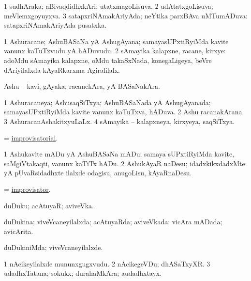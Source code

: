 \bentry
{}
\gl{\gu}
\bmng
\bnum
\num{1} sudhAraka; aBivaqdidhxkAri; utatxmagoLisuva. 
\num{2} udAtatxgoLisuva; meVlemxgoyuyxva. 
\num{3} satapxriNAmakAriyAda; neYtika parxBAva uMTumADuva:  satapxriNAmakAriyAda pusatxka. 
\enum
\emng
\eentry

\bentry
{}
\gl{\nA}
\bmng
\bnum
\num{1} Ashuracane; AshuBASaNa yA AshugAyana; samayasUPxtiRyiMda kavite \mo vanunx kaTuTxvudu yA hADuvudu. 
\num{2} sAmayika kalapxne, racane, kirxye:  adoMdu sAmayika kalapxne, oMdu takaSxNada, konegaLigeya, beVre dAriyilalxda kAyaRkarxma Agiralilalx. 
\enum
\emng
\eentry

\bentry
{}
\gl{\nA}
\bmng
Ashu -- kavi, gAyaka, racanekAra, yA BASaNakAra. 
\emng
\eentry

\bentry
{}
\gl{\gu}
\bmng
\bnum
\num{1} Ashuracaneya; AshusaqSiTxya; AshuBASaNada yA AshugAyanada; samayasUPxtiRyiMda kavite \mo vanunx kaTuTxva, hADuva. 
\num{2} Ashu racanakArana. 
\num{3} AshuracanAshakitxyuLaLx. 
\num{4} sAmayika -- kalapxneya, kirxyeya, saqSiTxya. 
\enum
\emng
\eentry

\bentry
{}
\gl{\gu}
\bmng
 = \hyperlink{improvisatorial}{improvisatorial}. 
\emng
\eentry

\bentry
{}
\gl{\sakirx}
\bmng
\bnum
\num{1} Ashukavite mADu yA AshuBASaNa mADu; samaya sUPxtiRyiMda kavite, saMgiVtakaqti, \mo vanunx kaTiTx hADu. 
\num{2} AshukAyaR naDesu; idadxkikxdadxMte yA pUvaRsidadhxte ilalxde odagisu, anugoLisu, kAyaRnaDesu. 
\enum
\emng
\eentry

\bentry
{}
\gl{\nA}
\bmng
 = \hyperlink{improvisator}{improvisator}. 
\emng
\eentry

\bentry
{}
\gl{\nA}
\bmng
duDuku; acAtuyaR; aviveVka. 
\emng
\eentry

\bentry
{}
\gl{\gu}
\bmng
duDukina; viveVcaneyilalxda; acAtuyaRda; aviveVkada; vicAra mADada; avicArita. 
\emng
\eentry

\bentry
{}
\gl{\kirxvi}
\bmng
duDukiniMda; viveVcaneyilalxde. 
\emng
\eentry

\bentry
{}
\gl{\nA}
\bmng
\bnum
\num{1} nAcikeyilalxde mununxgugxvudu. 
\num{2} nAcikegeVDu; dhASaTxyXR. 
\num{3} udadhxTatana; sokukx; durahaMkAra; audadhxtayx. 
\enum
\emng
\eentry

